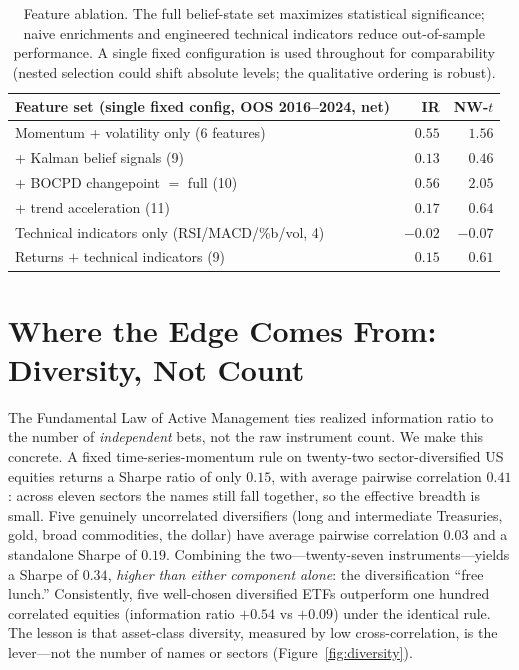\documentclass[11pt,a4paper]{article}
\theoremstyle{definition}
\begin{document}
\begin{table}[H]
\centering
\begin{tabular}{lrr}
\toprule
Feature set (single fixed config, OOS 2016--2024, net) & IR & NW-$t$ \\
\midrule
Momentum + volatility only (6 features)            & $0.55$ & $1.56$ \\
\quad + Kalman belief signals (9)                  & $0.13$ & $0.46$ \\
\quad + BOCPD changepoint $=$ full (10)            & $\mathbf{0.56}$ & $\mathbf{2.05}$ \\
\quad + trend acceleration (11)                    & $0.17$ & $0.64$ \\
Technical indicators only (RSI/MACD/\%b/vol, 4)     & $-0.02$ & $-0.07$ \\
Returns $+$ technical indicators (9)               & $0.15$ & $0.61$ \\
\bottomrule
\end{tabular}
\caption{Feature ablation. The full belief-state set maximizes statistical significance; naive
enrichments and engineered technical indicators reduce out-of-sample performance. A single fixed
configuration is used throughout for comparability (nested selection could shift absolute levels;
the qualitative ordering is robust).}
\label{tab:ablation}
\end{table}

\section{Where the Edge Comes From: Diversity, Not Count}
\label{sec:diversity}

The Fundamental Law of Active Management \cite{grinold1999} ties realized information ratio to the
number of \emph{independent} bets, not the raw instrument count. We make this concrete. A
fixed time-series-momentum rule on twenty-two sector-diversified US equities returns a Sharpe ratio
of only $0.15$, with average pairwise correlation $0.41$: across eleven sectors the names still
fall together, so the effective breadth is small. Five genuinely uncorrelated diversifiers (long
and intermediate Treasuries, gold, broad commodities, the dollar) have average pairwise correlation
$0.03$ and a standalone Sharpe of $0.19$. Combining the two---twenty-seven instruments---yields a
Sharpe of $0.34$, \emph{higher than either component alone}: the diversification ``free lunch.''
Consistently, five well-chosen diversified ETFs outperform one hundred correlated equities
(information ratio $+0.54$ vs $+0.09$) under the identical rule. The lesson is that asset-class
diversity, measured by low cross-correlation, is the lever---not the number of names or sectors
(Figure~\ref{fig:diversity}).
\end{document}
